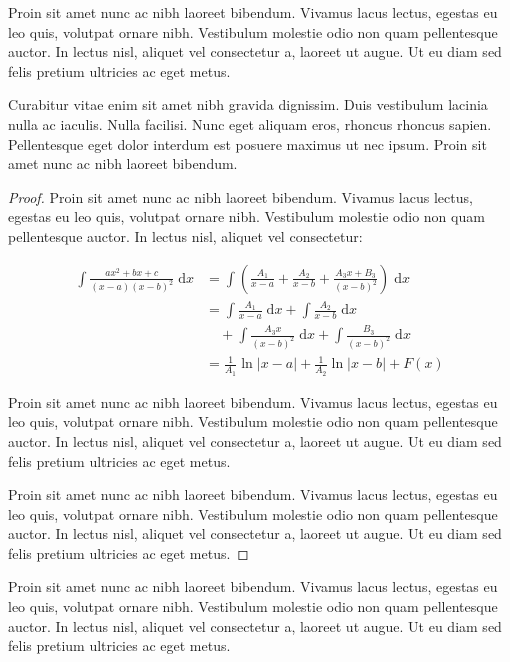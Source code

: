 Proin sit amet nunc ac nibh laoreet bibendum. Vivamus lacus lectus, egestas eu leo quis, volutpat ornare nibh. Vestibulum molestie odio non quam pellentesque auctor. In lectus nisl, aliquet vel consectetur a, laoreet ut augue. Ut eu diam sed felis pretium ultricies ac eget metus.

\begin{theorem}
Curabitur vitae enim sit amet nibh gravida dignissim. Duis vestibulum lacinia nulla ac iaculis. Nulla facilisi. Nunc eget aliquam eros, rhoncus rhoncus sapien. Pellentesque eget dolor interdum est posuere maximus ut nec ipsum. Proin sit amet nunc ac nibh laoreet bibendum.	
\end{theorem}

\begin{proof}
Proin sit amet nunc ac nibh laoreet bibendum. Vivamus lacus lectus, egestas eu leo quis, volutpat ornare nibh. Vestibulum molestie odio non quam pellentesque auctor. In lectus nisl, aliquet vel consectetur:

\begin{align}
\int \frac{ax^2+bx+c}{(x-a)(x-b)^2} \;\mathrm{d}x
& = \int \left( \frac{A_1}{x-a} + \frac{A_2}{x-b} + \frac{A_3x+B_3}{(x-b)^2} \right) \;\mathrm{d}x
\\ \nonumber
& = \int \frac{A_1}{x-a} \;\mathrm{d}x + \int \frac{A_2}{x-b} \;\mathrm{d}x 
\\
& \quad + \int \frac{A_3x}{(x-b)^2} \;\mathrm{d}x + \int \frac{B_3}{(x-b)^2} \;\mathrm{d}x
\\
& = \frac{1}{A_1} \ln \lvert x-a \rvert + \frac{1}{A_2}\ln \lvert x-b \rvert + F(x)
\end{align}

Proin sit amet nunc ac nibh laoreet bibendum. Vivamus lacus lectus, egestas eu leo quis, volutpat ornare nibh. Vestibulum molestie odio non quam pellentesque auctor. In lectus nisl, aliquet vel consectetur a, laoreet ut augue. Ut eu diam sed felis pretium ultricies ac eget metus.

Proin sit amet nunc ac nibh laoreet bibendum. Vivamus lacus lectus, egestas eu leo quis, volutpat ornare nibh. Vestibulum molestie odio non quam pellentesque auctor. In lectus nisl, aliquet vel consectetur a, laoreet ut augue. Ut eu diam sed felis pretium ultricies ac eget metus.
\end{proof}

Proin sit amet nunc ac nibh laoreet bibendum. Vivamus lacus lectus, egestas eu leo quis, volutpat ornare nibh. Vestibulum molestie odio non quam pellentesque auctor. In lectus nisl, aliquet vel consectetur a, laoreet ut augue. Ut eu diam sed felis pretium ultricies ac eget metus.



